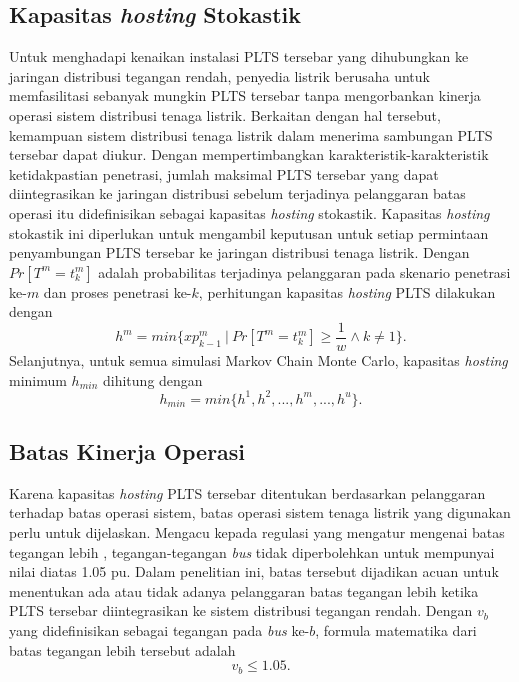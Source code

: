 \subsection{Kapasitas \textit{\textit{hosting}} Stokastik}
Untuk menghadapi kenaikan instalasi PLTS tersebar yang dihubungkan ke jaringan distribusi tegangan rendah, penyedia listrik berusaha untuk memfasilitasi sebanyak mungkin PLTS tersebar tanpa mengorbankan kinerja operasi sistem distribusi tenaga listrik. Berkaitan dengan hal tersebut, kemampuan sistem distribusi tenaga listrik dalam menerima sambungan PLTS tersebar dapat diukur. Dengan mempertimbangkan karakteristik-karakteristik ketidakpastian penetrasi, jumlah maksimal PLTS tersebar yang dapat diintegrasikan ke jaringan distribusi sebelum terjadinya pelanggaran batas operasi itu didefinisikan sebagai kapasitas \textit{\textit{hosting}} stokastik. Kapasitas \textit{\textit{hosting}} stokastik ini diperlukan untuk mengambil keputusan untuk setiap permintaan penyambungan PLTS tersebar ke jaringan distribusi tenaga listrik. Dengan $Pr[T^m=\mathit{t^m_k}]$ adalah probabilitas terjadinya pelanggaran pada skenario penetrasi ke-$m$ dan proses penetrasi ke-$k$, perhitungan kapasitas \textit{\textit{hosting}} PLTS dilakukan dengan
\begin{equation}\label{phc1}
\mathit{h^m}=min\Big\{\mathit{xp^m_{k-\text{1}}}\ |\ Pr[T^m=\mathit{t^m_k}]\geq \frac{1}{w}\wedge k\neq 1\Big\}.
\end{equation}
Selanjutnya, untuk semua simulasi Markov Chain Monte Carlo, kapasitas \textit{\textit{hosting}} minimum $h_{min}$ dihitung dengan
\begin{equation}\label{phc2}
\mathit{h_{min}}=min\{h^1,h^2,...,h^m,...,h^u\}.
\end{equation}

\subsection{Batas Kinerja Operasi}
Karena kapasitas \textit{\textit{hosting}} PLTS tersebar ditentukan berdasarkan pelanggaran terhadap batas operasi sistem, batas operasi sistem tenaga listrik yang digunakan perlu untuk dijelaskan. Mengacu kepada regulasi yang mengatur mengenai batas tegangan lebih \cite{ANSI2011}, tegangan-tegangan \textit{bus} tidak diperbolehkan untuk mempunyai nilai diatas 1.05 pu. Dalam penelitian ini, batas tersebut dijadikan acuan untuk menentukan ada atau tidak adanya pelanggaran batas tegangan lebih ketika PLTS tersebar diintegrasikan ke sistem distribusi tegangan rendah. Dengan $v_b$ yang didefinisikan sebagai tegangan pada \textit{bus} ke-$b$, formula matematika dari batas tegangan lebih tersebut adalah
\begin{equation}
v_b \le 1.05\label{vlim}.
\end{equation}


